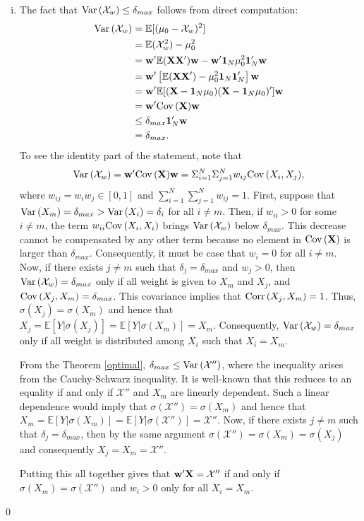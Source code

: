 \documentclass[12pt]{article}
\newcommand{\E}{\mathbb{E}}
\theoremstyle{definition}
\theoremstyle{definition}
\def\one{{\bf 1}}
\def\w{{\bf w}}
\def\X{{\bf X}}
\def\E{{\mathbb E}}
\def\Var{{\rm Var}\,}
\def\Cov{{\rm Cov}\,}
\def\Corr{{\rm Corr}\,}
\begin{document}
\begin{enumerate}[i)]

\item The fact that $\Var(\mathcal{X}_w)\leq \delta_{max}$ follows from direct computation:
\begin{align*}
\Var(\mathcal{X}_w) &= \E[(\mu_0 - \mathcal{X}_w)^2]\\
&= \E(\mathcal{X}_w^2) - \mu_0^2\\
&= \w' \E(\X \X')\w - \w'\one_N \mu_0^2\one_N'\w\\
&= \w' \left[ \E(\X \X') - \mu_0^2 \one_N \one_N' \right]\w\\
&= \w' \E[(\X - \one_N \mu_0)(\X - \one_N \mu_0)']\w\\
&= \w' \Cov(\X)\w\\
&\leq \delta_{max} \one_N'\w\\
&= \delta_{max}.
\end{align*}
To see the identity part of the statement, note that $$\Var(\mathcal{X}_w)  = \w' \Cov(\X)\w = \Sigma_{i=1}^N \Sigma_{j=1}^N w_{ij} \Cov(X_i, X_j),$$ where $w_{ij} = w_iw_j \in [0,1]$ and $\sum_{i=1}^N \sum_{j=1}^N w_{ij} = 1$.  First, suppose that $\Var(X_m) = \delta_{max} > \Var(X_i) = \delta_i$ for all $i \neq m$. Then, if $w_{ii} > 0$ for some $i \neq m$, the term $w_{ii}\Cov(X_i, X_i)$ brings $\Var(\mathcal{X}_w)$ below $\delta_{max}$. This decrease cannot be compensated by any other term because no element in $\Cov(\X)$ is larger than $\delta_{max}$. Consequently, it must be case that $w_i = 0$ for all $i \neq m$. Now, if there exists $j \neq m$ such that $\delta_j = \delta_{max}$ and $w_j > 0$, then $\Var(\mathcal{X}_w) = \delta_{max}$ only if all weight is given to $X_m$ and $X_j$, and $\Cov(X_j, X_m) = \delta_{max}$. This covariance implies that $\Corr(X_j, X_m) = 1$. Thus, $\sigma(X_j) = \sigma(X_m)$ and hence that $X_j = \E[Y | \sigma(X_j)] = \E[Y | \sigma(X_m)] = X_m$. Consequently, $\Var(\mathcal{X}_w) = \delta_{max}$ only if all weight is distributed among $X_i$ such that $X_i = X_m$. 

 From the Theorem \ref{optimal}, $\delta_{max} \leq \Var(\mathcal{X}'')$, where the inequality arises from the Cauchy-Schwarz inequality. It is well-known that this reduces to an equality if and only if $\mathcal{X}''$ and $X_m$ are linearly dependent. Such a linear dependence would imply that $\sigma(\mathcal{X}'') = \sigma(X_m)$ and hence that $X_m = \E[Y | \sigma(X_m)] = \E[Y | \sigma(\mathcal{X}'')] = \mathcal{X}''$. Now, if there exists $j \neq m$ such that $\delta_j = \delta_{max}$, then by the same argument $\sigma(\mathcal{X}'') = \sigma(X_m) = \sigma(X_j)$ and consequently $X_j = X_m = \mathcal{X}''$. 

Putting this all together gives that $\w'\X = \mathcal{X}''$ if and only if $\sigma(X_m) = \sigma(\mathcal{X}'')$ and $w_i > 0$ only for all $X_i = X_m$.

\end{enumerate}
\qed
\end{document}
